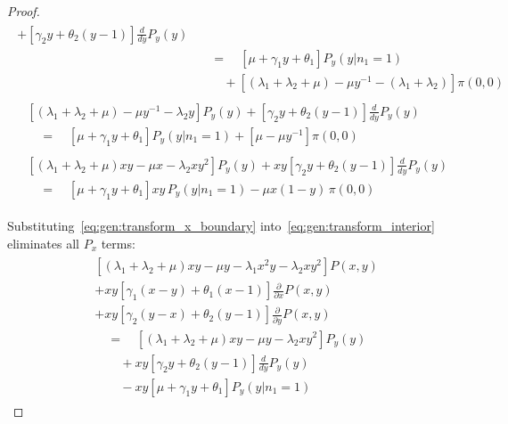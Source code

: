 \begin{proof}
\begin{align}
\begin{split}
            + \left[ \gamma_2 y + \theta_2(y-1) \right] \frac{d}{dy} P_y(y) \\
            & \quad = \quad \left[ \mu + \gamma_1 y + \theta_1 \right] P_y(y | n_1=1) \\
            & \quad \quad + \left[ (\lambda_1 + \lambda_2 + \mu) - \mu y^{-1} - (\lambda_1 + \lambda_2) \right] \pi(0, 0)
        \end{split} \nonumber \\
        \begin{split}
            & \left[ (\lambda_1 + \lambda_2 + \mu) - \mu y^{-1} - \lambda_2 y \right] P_y(y)
            + \left[ \gamma_2 y + \theta_2(y-1) \right] \frac{d}{dy} P_y(y) \\
            & \quad = \quad \left[ \mu + \gamma_1 y + \theta_1 \right] P_y(y | n_1=1)
            + \left[ \mu - \mu y^{-1} \right] \pi(0, 0)
        \end{split} \nonumber \\
        \begin{split}
            & \left[ (\lambda_1 + \lambda_2 + \mu)xy - \mu x - \lambda_2 x y^2 \right] P_y(y)
            + xy \left[ \gamma_2 y + \theta_2(y-1) \right] \frac{d}{dy} P_y(y) \\
            & \quad = \quad \left[ \mu + \gamma_1 y + \theta_1 \right] xy \, P_y(y | n_1=1)
            - \mu x(1-y) \, \pi(0,0)
        \end{split} \label{eq:gen:transform_y_boundary}
    \end{align}
    
    Substituting~\eqref{eq:gen:transform_x_boundary} into~\eqref{eq:gen:transform_interior} eliminates all $P_x$ terms:
    \begin{align}
        \begin{split}
            & \left[ (\lambda_1+\lambda_2+\mu)xy - \mu y - \lambda_1 x^2 y - \lambda_2 x y^2 \right] P(x,y) \\
            & + xy \left[ \gamma_1(x-y) + \theta_1(x-1) \right] \frac{\partial}{\partial x} P(x,y) \\
            & + xy \left[ \gamma_2(y-x) + \theta_2(y-1) \right] \frac{\partial}{\partial y} P(x,y) \\
            & \quad = \quad \left[ (\lambda_1 + \lambda_2 + \mu)xy - \mu y - \lambda_2 x y^2 \right] P_y(y) \\
            & \quad \quad + xy \left[ \gamma_2 y + \theta_2(y-1) \right] \frac{d}{dy} P_y(y) \\
            & \quad \quad - xy \left[ \mu + \gamma_1 y + \theta_1 \right] P_y(y | n_1=1)
        \end{split} \label{eq:gen:plugged_interior_x}
    \end{align}
    

\end{proof}

